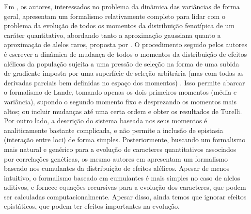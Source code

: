 Em \cite{Barton1987}, os autores, interessados no problema da dinâmica
das variâncias de forma geral, apresentam um formalismo relativamente
completo para lidar com o problema da evolução de todos os momentos da
distribuição fenotípica de um caráter quantitativo, abordando tanto a
aproximação gaussiana quanto a aproximação de alelos raros, proposta por
\cite{Turelli1984}.
O procedimento seguido pelos autores é escrever a dinâmica de mudança de
todos o momentos da distribuição de efeitos alélicos da população
sujeita a uma pressão de seleção na forma de uma subida de gradiente
imposta por uma superfície de seleção arbitrária (mas com todas as
derivadas parciais bem definidas no espaço dos momentos)
\citep{Arnold2001a}.
Isso permite abarcar o formalismo de Lande, tomando apenas os dois
primeiros momentos (média e variância), supondo o segundo momento fixo e
desprezando os momentos mais altos; ou incluir mudanças até uma certa
ordem e obter os resultados de Turelli.
Por outro lado, a descrição do sistema baseada nos seus momentos é
analiticamente bastante complicada, e não permite a inclusão de
epistasia (interação entre loci) de forma simples.
Posteriormente, buscando um formalismo mais natural e genérico para a
evolução de caracteres quantitativos associados por correlações
genéticas, os mesmo autores em \cite{Turelli1994} apresentam um
formalismo baseado nos cumulantes da distribuição de efeitos alélicos.
Apesar de menos intuitivo, o formalismo baseado em cumulantes é mais
simples no caso de alelos aditivos, e fornece equações
recursivas para a evolução dos caracteres, que podem ser calculadas
computacionalmente.
Apesar disso, ainda temos que ignorar efeitos epistáticos, que podem ter
efeitos importantes na evolução.

